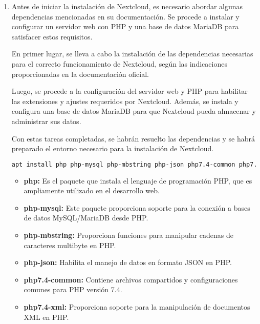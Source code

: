 \begin{enumerate}
				\item Antes de iniciar la instalación de Nextcloud, es necesario abordar algunas dependencias mencionadas en su documentación. Se procede a instalar y configurar un servidor web con PHP y una base de datos MariaDB para satisfacer estos requisitos.
				
				En primer lugar, se lleva a cabo la instalación de las dependencias necesarias para el correcto funcionamiento de Nextcloud, según las indicaciones proporcionadas en la documentación oficial.
				
				Luego, se procede a la configuración del servidor web y PHP para habilitar las extensiones y ajustes requeridos por Nextcloud. Además, se instala y configura una base de datos MariaDB para que Nextcloud pueda almacenar y administrar sus datos.
				
				Con estas tareas completadas, se habrán resuelto las dependencias y se habrá preparado el entorno necesario para la instalación de Nextcloud. 
				
				
				
				\begin{lstlisting}[language=Bash,caption=Directorio de trabajo NextCloud]
		apt install php php-mysql php-mbstring php-json php7.4-common php7.4-xml php-zip php-gd curl php-curl php-pear php7.4-opcache php-intl mariadb-server
				\end{lstlisting}
			
				\begin{itemize}
					\item \textbf{php:} Es el paquete que instala el lenguaje de programación PHP, que es ampliamente utilizado en el desarrollo web.
					
					\item \textbf{php-mysql:} Este paquete proporciona soporte para la conexión a bases de datos MySQL/MariaDB desde PHP.
					
					\item \textbf{ php-mbstring:} Proporciona funciones para manipular cadenas de caracteres multibyte en PHP.
					
					\item \textbf{php-json:} Habilita el manejo de datos en formato JSON en PHP.
					
					\item \textbf{php7.4-common:} Contiene archivos compartidos y configuraciones comunes para PHP versión 7.4.
					
					\item \textbf{php7.4-xml:} Proporciona soporte para la manipulación de documentos XML en PHP.
					

\end{itemize}
\end{enumerate}
